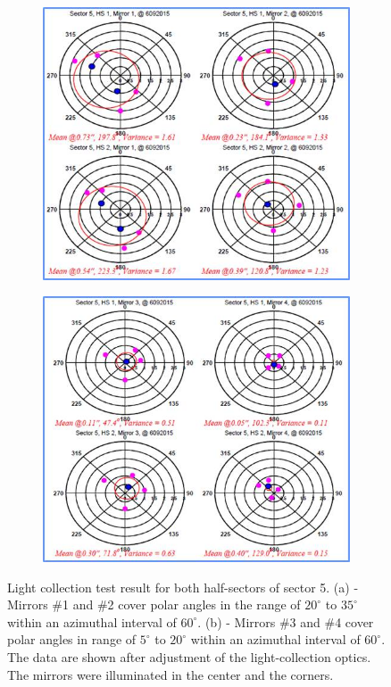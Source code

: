 \begin{figure}
\begin{subfigure}[b]{0.49\textwidth}
    \includegraphics[width=1.0\textwidth]{images/GEO_TEST_Sect5_M_1_M_2.jpg}
    \caption{} \label{fig:subfig1_a}
\end{subfigure}
\hspace*{\fill} %
\begin{subfigure}[b]{0.5\textwidth}
    \includegraphics[width=1.0\linewidth]{images/GEO_TEST_Sect5_M_3_M_4.jpg}
    \caption{} \label{fig:subfig1_b}
\end{subfigure}
\caption{Light collection test result for both half-sectors of sector 5. (a) - Mirrors \#1 and \#2 cover polar
  angles in the range of $20^\circ$ to $35^\circ$  within an azimuthal interval of $60^\circ$. (b) - Mirrors \#3 and
  \#4 cover polar angles in range of $5^\circ$ to $20^\circ$  within an azimuthal interval of $60^\circ$. The data
  are shown after adjustment of the light-collection optics. The mirrors were illuminated in the center and the
  corners.} 
\label{fig:subfig}
\end{figure}

